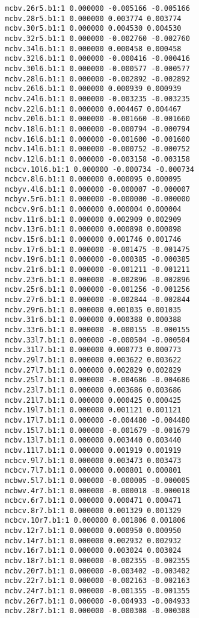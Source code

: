 \begin{verbatim}
mcbv.26r5.b1:1 0.000000 -0.005166 -0.005166
mcbv.28r5.b1:1 0.000000 0.003774 0.003774
mcbv.30r5.b1:1 0.000000 0.004530 0.004530
mcbv.32r5.b1:1 0.000000 -0.002760 -0.002760
mcbv.34l6.b1:1 0.000000 0.000458 0.000458
mcbv.32l6.b1:1 0.000000 -0.000416 -0.000416
mcbv.30l6.b1:1 0.000000 -0.000577 -0.000577
mcbv.28l6.b1:1 0.000000 -0.002892 -0.002892
mcbv.26l6.b1:1 0.000000 0.000939 0.000939
mcbv.24l6.b1:1 0.000000 -0.003235 -0.003235
mcbv.22l6.b1:1 0.000000 0.004467 0.004467
mcbv.20l6.b1:1 0.000000 -0.001660 -0.001660
mcbv.18l6.b1:1 0.000000 -0.000794 -0.000794
mcbv.16l6.b1:1 0.000000 -0.001600 -0.001600
mcbv.14l6.b1:1 0.000000 -0.000752 -0.000752
mcbv.12l6.b1:1 0.000000 -0.003158 -0.003158
mcbcv.10l6.b1:1 0.000000 -0.000734 -0.000734
mcbcv.8l6.b1:1 0.000000 0.000095 0.000095
mcbyv.4l6.b1:1 0.000000 -0.000007 -0.000007
mcbyv.5r6.b1:1 0.000000 -0.000000 -0.000000
mcbcv.9r6.b1:1 0.000000 0.000004 0.000004
mcbv.11r6.b1:1 0.000000 0.002909 0.002909
mcbv.13r6.b1:1 0.000000 0.000898 0.000898
mcbv.15r6.b1:1 0.000000 0.001746 0.001746
mcbv.17r6.b1:1 0.000000 -0.001475 -0.001475
mcbv.19r6.b1:1 0.000000 -0.000385 -0.000385
mcbv.21r6.b1:1 0.000000 -0.001211 -0.001211
mcbv.23r6.b1:1 0.000000 -0.002896 -0.002896
mcbv.25r6.b1:1 0.000000 -0.001256 -0.001256
mcbv.27r6.b1:1 0.000000 -0.002844 -0.002844
mcbv.29r6.b1:1 0.000000 0.001035 0.001035
mcbv.31r6.b1:1 0.000000 0.000388 0.000388
mcbv.33r6.b1:1 0.000000 -0.000155 -0.000155
mcbv.33l7.b1:1 0.000000 -0.000504 -0.000504
mcbv.31l7.b1:1 0.000000 0.000773 0.000773
mcbv.29l7.b1:1 0.000000 0.003622 0.003622
mcbv.27l7.b1:1 0.000000 0.002829 0.002829
mcbv.25l7.b1:1 0.000000 -0.004686 -0.004686
mcbv.23l7.b1:1 0.000000 0.003686 0.003686
mcbv.21l7.b1:1 0.000000 0.000425 0.000425
mcbv.19l7.b1:1 0.000000 0.001121 0.001121
mcbv.17l7.b1:1 0.000000 -0.004480 -0.004480
mcbv.15l7.b1:1 0.000000 -0.001679 -0.001679
mcbv.13l7.b1:1 0.000000 0.003440 0.003440
mcbv.11l7.b1:1 0.000000 0.001919 0.001919
mcbcv.9l7.b1:1 0.000000 0.003473 0.003473
mcbcv.7l7.b1:1 0.000000 0.000801 0.000801
mcbwv.5l7.b1:1 0.000000 -0.000005 -0.000005
mcbwv.4r7.b1:1 0.000000 -0.000018 -0.000018
mcbcv.6r7.b1:1 0.000000 0.000471 0.000471
mcbcv.8r7.b1:1 0.000000 0.001329 0.001329
mcbcv.10r7.b1:1 0.000000 0.001806 0.001806
mcbv.12r7.b1:1 0.000000 0.000950 0.000950
mcbv.14r7.b1:1 0.000000 0.002932 0.002932
mcbv.16r7.b1:1 0.000000 0.003024 0.003024
mcbv.18r7.b1:1 0.000000 -0.002355 -0.002355
mcbv.20r7.b1:1 0.000000 -0.003402 -0.003402
mcbv.22r7.b1:1 0.000000 -0.002163 -0.002163
mcbv.24r7.b1:1 0.000000 -0.001355 -0.001355
mcbv.26r7.b1:1 0.000000 -0.004933 -0.004933
mcbv.28r7.b1:1 0.000000 -0.000308 -0.000308

\end{verbatim}
